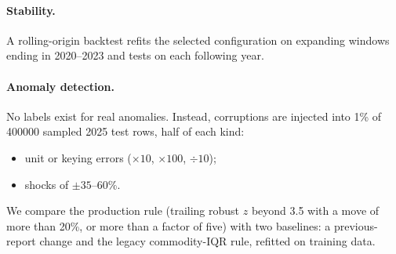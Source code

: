 \paragraph{Stability.}
A rolling-origin backtest refits the selected configuration on expanding windows ending in 2020--2023 and tests on each following year.

\paragraph{Anomaly detection.}
No labels exist for real anomalies.
Instead, corruptions are injected into 1\% of \num{400000} sampled 2025 test rows, half of each kind:
\begin{itemize}
  \item unit or keying errors ($\times10$, $\times100$, $\div10$);
  \item shocks of $\pm35$--60\%.
\end{itemize}
We compare the production rule (trailing robust $z$ beyond 3.5 with a move of more than 20\%, or more than a factor of five) with two baselines: a previous-report change and the legacy commodity-IQR rule, refitted on training data.
